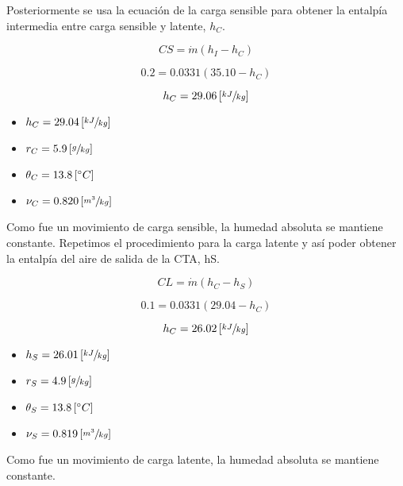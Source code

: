 \documentclass[11pt]{article}
\begin{document}
Posteriormente se usa la ecuación de la carga sensible para obtener la entalpía intermedia entre carga sensible y latente, $ h_C $. 

\[ CS = \dot{ m } \left( h_I - h_C \right) \]

\[ 0.2 = 0.0331 \left( 35.10 - h_C \right) \]

\[ h_C = 29.06 \left[ \sfrac{ kJ }{ kg } \right]\]

\begin{itemize}
    \item
    $ h_C = 29.04 \left[ \sfrac{ kJ }{ kg } \right] $

    \item
    $ r_C = 5.9 \left[ \sfrac{ g }{ kg } \right] $

    \item
    $ \theta _C = 13.8 \left[ \degree C \right] $

    \item
    $ \nu _C = 0.820 \left[ \sfrac{ m^3 }{ kg } \right] $

\end{itemize}

Como fue un movimiento de carga sensible, la humedad absoluta se mantiene constante.
Repetimos el procedimiento para la carga latente y así poder obtener la entalpía del aire de salida de la CTA, hS.

\[ CL = \dot{ m } \left( h_C - h_S \right) \]

\[ 0.1 = 0.0331 \left( 29.04 - h_C \right) \]

\[ h_C = 26.02 \left[ \sfrac{ kJ }{ kg } \right]\]

\begin{itemize}
    \item
    $ h_S = 26.01 \left[ \sfrac{ kJ }{ kg } \right] $
    
    \item
    $ r_S = 4.9 \left[ \sfrac{ g }{ kg } \right] $
    
    \item
    $ \theta _S = 13.8 \left[ \degree C \right] $
    
    \item
    $ \nu _S = 0.819 \left[ \sfrac{ m^3 }{ kg } \right] $

\end{itemize}

Como fue un movimiento de carga latente, la humedad absoluta se mantiene constante.

\section{}
\end{document}
